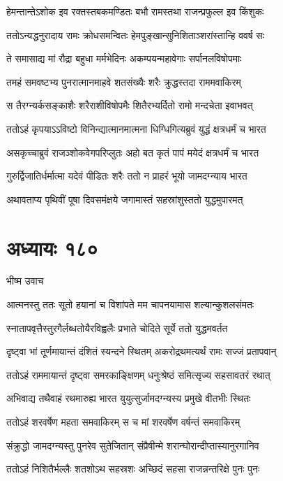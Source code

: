 \twolineshloka
{हेमन्तान्तेऽशोक इव रक्तस्तबकमण्डितः}
{बभौ रामस्तथा राजन्प्रफुल्ल इव किंशुकः}


\twolineshloka
{ततोऽन्यद्धनुरादाय रामः क्रोधसमन्वितः}
{हेमपुङ्खान्सुनिशिताञ्शरांस्तान्हि ववर्ष सः}


\twolineshloka
{ते समासाद्य मां रौद्रा बहुधा मर्मभेदिनः}
{अकम्पयन्महावेगाः सर्पानलविषोपमाः}


\twolineshloka
{तमहं समवष्टभ्य पुनरात्मानमाहवे}
{शतसंख्यैः शरैः क्रुद्धस्तदा राममवाकिरम्}


\twolineshloka
{स तैरग्न्यर्कसङ्काशैः शरैराशीविषोपमैः}
{शितैरभ्यर्दितो रामो मन्दचेता इवाभवत्}


\twolineshloka
{ततोऽहं कृपयाऽऽविष्टो विनिन्द्यात्मानमात्मना}
{धिग्धिगित्यब्रुवं युद्धं क्षत्रधर्मं च भारत}


\twolineshloka
{असकृच्चाब्रुवं राजञ्शोकवेगपरिप्लुतः}
{अहो बत कृतं पापं मयेदं क्षत्रधर्मं च भारत}


\twolineshloka
{गुरुर्द्विजातिर्धर्मात्मा यदेवं पीडितः शरैः}
{ततो न प्राहरं भूयो जामदग्न्याय भारत}


\twolineshloka
{अथावताप्य पृथिवीं पूषा दिवसमंक्षये}
{जगामास्तं सहस्रांशुस्ततो युद्धमुपारमत्}


\chapter{अध्यायः १८०}
\twolineshloka
{भीष्म उवाच}
{}


\twolineshloka
{आत्मनस्तु ततः सूतो हयानां च विशांपते}
{मम चापनयामास शल्यान्कुशलसंमतः}


\twolineshloka
{स्नातापवृत्तैस्तुरगैर्लब्धतोयैरविह्वलैः}
{प्रभाते चोदिते सूर्ये ततो युद्धमवर्तत}


\twolineshloka
{दृष्ट्वा भां तूर्णमायान्तं दंशितं स्यन्दने स्थितम्}
{अकरोद्रथमत्यर्थं रामः सज्जं प्रतापवान्}


\twolineshloka
{ततोऽहं राममायान्तं दृष्ट्वा समरकाङ्क्षिणम्}
{धनुःश्रेष्ठं समित्सृज्य सहसावतरं रथात्}


\twolineshloka
{अभिवाद्य तथैवाहं रथमारुह्य भारत}
{युयुत्सुर्जामदग्न्यस्य प्रमुखे वीतभीः स्थितः}


\twolineshloka
{ततोऽहं शरवर्षेण महता समवाकिरम्}
{स च मां शरवर्षेण वर्षन्तं समवाकिरम्}


\twolineshloka
{संक्रुद्धो जामदग्न्यस्तु पुनरेव सुतेजितान्}
{संप्रैषीन्मे शरान्घोरान्दीप्तास्यानुरगानिव}


\twolineshloka
{ततोऽहं निशितैर्भल्लैः शतशोऽथ सहस्रशः}
{अच्छिदं सहसा राजन्नन्तरिक्षे पुनः पुनः}


